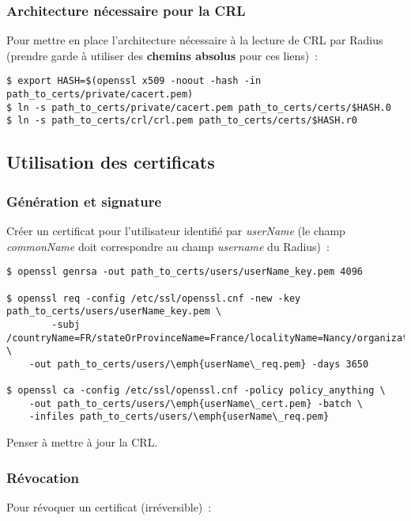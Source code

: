 \subsubsection{Architecture nécessaire pour la CRL}

Pour mettre en place l'architecture nécessaire à la lecture de CRL par Radius (prendre garde à utiliser des \textbf{chemins absolus} pour ces liens)~:

\begin{lstlisting}
$ export HASH=$(openssl x509 -noout -hash -in path_to_certs/private/cacert.pem)
$ ln -s path_to_certs/private/cacert.pem path_to_certs/certs/$HASH.0
$ ln -s path_to_certs/crl/crl.pem path_to_certs/certs/$HASH.r0
\end{lstlisting}

\subsection{Utilisation des certificats}
\subsubsection{Génération et signature}

Créer un certificat pour l'utilisateur identifié par \emph{userName} (le champ \emph{commonName} doit correspondre au champ \emph{username} du Radius)~:

\begin{lstlisting}
$ openssl genrsa -out path_to_certs/users/userName_key.pem 4096

$ openssl req -config /etc/ssl/openssl.cnf -new -key path_to_certs/users/userName_key.pem \
        -subj /countryName=FR/stateOrProvinceName=France/localityName=Nancy/organizationName=BHConsulting/commonName=userName/ \
	-out path_to_certs/users/\emph{userName\_req.pem} -days 3650

$ openssl ca -config /etc/ssl/openssl.cnf -policy policy_anything \
	-out path_to_certs/users/\emph{userName\_cert.pem} -batch \
	-infiles path_to_certs/users/\emph{userName\_req.pem}
\end{lstlisting}

Penser à mettre à jour la CRL.

\subsubsection{Révocation}

Pour révoquer un certificat (irréversible)~: 

